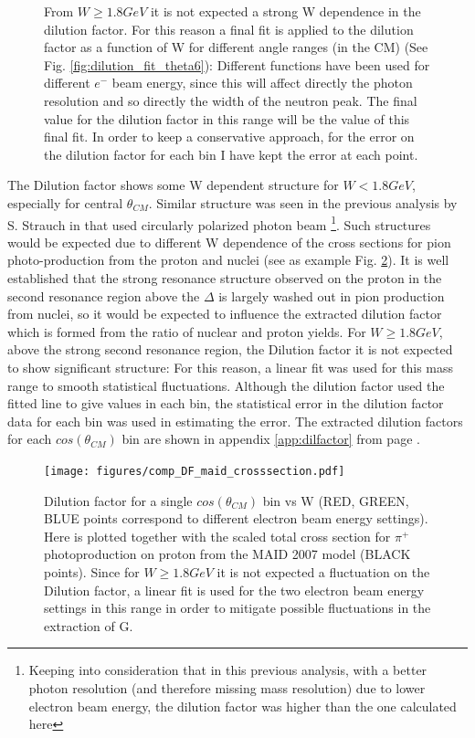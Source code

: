 \begin{figure}[htb]
\begin{center}
{      From $W\geq 1.8 GeV$ it is not expected a strong W dependence in the dilution factor. For this reason a final fit is applied to the dilution factor as a function of W for different angle ranges (in the CM) (See Fig. \ref{fig:dilution_fit_theta6}): Different functions have been used for different $e^-$ beam energy, since this will affect directly the photon resolution and so directly the width of the neutron peak. The final value for the dilution factor in this range will be the value of this final fit. In order to keep a conservative approach, for the error on the dilution factor for each bin I have kept the error at each point. }
    \label{fig:dilution_fit_comp}
  \end{center}
\end{figure}

The Dilution factor shows some W dependent structure for $W < 1.8GeV$, especially for central $\theta_{CM}$. Similar structure was seen in the previous analysis by S. Strauch in \cite{Strauch_2014} that used circularly polarized photon beam \footnote{Keeping into consideration that in this previous analysis, with a better photon resolution (and therefore missing mass resolution) due to lower electron beam energy, the dilution factor was higher than the one calculated here}. Such structures would be expected due to different W dependence of the cross sections for pion photo-production from the proton and nuclei (see as example Fig. \ref{fig:comparison_dilutionfactor}). It is well established that the strong resonance structure observed on the proton in the second resonance region above the $\Delta$  is largely washed out in pion production from nuclei, so it would be expected to influence the extracted dilution factor which is formed from the ratio of nuclear and proton yields. For $W \geq 1.8GeV$, above the strong second resonance region, the Dilution factor it is not expected to show significant structure: For this reason, a linear fit was used for this mass range to smooth statistical fluctuations. Although the dilution factor used the fitted line to give values in each bin, the statistical error in the dilution factor data for each bin was used in estimating the error. The extracted dilution factors for each $cos(\theta_{CM})$ bin are shown in  appendix \ref{app:dilfactor} from page \pageref{app:dilfactor}.  

\begin{figure}[htb]
  \begin{center}
    \texttt{[image: figures/comp\_DF\_maid\_crosssection.pdf]} \\
    \caption{Dilution factor for a single $cos(\theta_{CM})$ bin vs W (RED, GREEN, BLUE points correspond to different electron beam energy settings). Here is plotted together with the scaled total cross section for $\pi^+$ photoproduction on proton from the MAID 2007 model \cite{MAID_2007} (BLACK points). Since for $W \geq 1.8GeV$ it is not expected a fluctuation on the Dilution factor, a linear fit is used for the two electron beam energy settings in this range in order to mitigate possible fluctuations in the extraction of G.}
    \label{fig:comparison_dilutionfactor}
  \end{center}
\end{figure}


